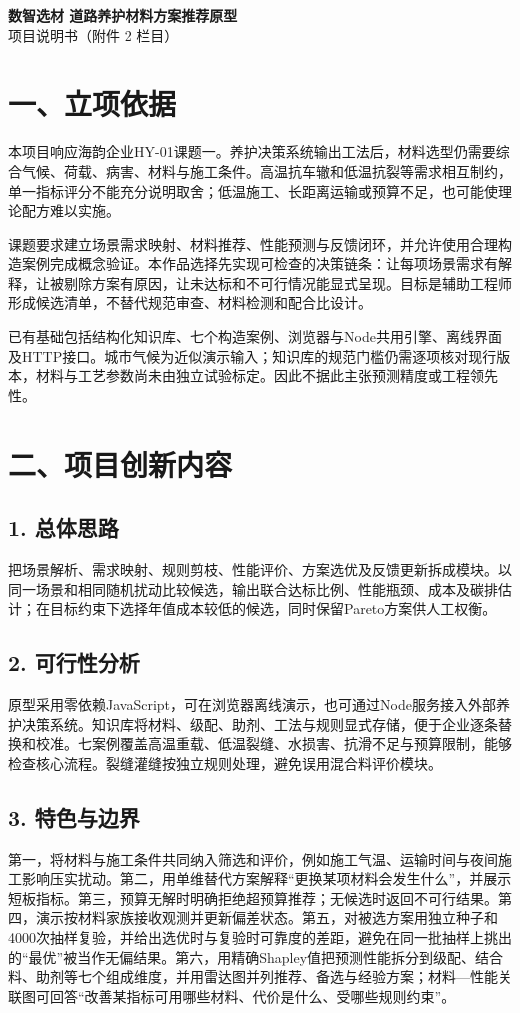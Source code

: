 \documentclass[UTF8,fontset=none,zihao=-4,a4paper]{ctexart}
\begin{document}
\begin{center}{\Large\bfseries\sffamily 数智选材 道路养护材料方案推荐原型}\\[4pt]{\large 项目说明书（附件 2 栏目）}\end{center}
\vspace{2pt}
\section*{一、立项依据}
本项目响应海韵企业HY-01课题一。养护决策系统输出工法后，材料选型仍需要综合气候、荷载、病害、材料与施工条件。高温抗车辙和低温抗裂等需求相互制约，单一指标评分不能充分说明取舍；低温施工、长距离运输或预算不足，也可能使理论配方难以实施。

课题要求建立场景需求映射、材料推荐、性能预测与反馈闭环，并允许使用合理构造案例完成概念验证。本作品选择先实现可检查的决策链条：让每项场景需求有解释，让被剔除方案有原因，让未达标和不可行情况能显式呈现。目标是辅助工程师形成候选清单，不替代规范审查、材料检测和配合比设计。

已有基础包括结构化知识库、七个构造案例、浏览器与Node共用引擎、离线界面及HTTP接口。城市气候为近似演示输入；知识库的规范门槛仍需逐项核对现行版本，材料与工艺参数尚未由独立试验标定。因此不据此主张预测精度或工程领先性。

\section*{二、项目创新内容}
\subsection*{1. 总体思路}
把场景解析、需求映射、规则剪枝、性能评价、方案选优及反馈更新拆成模块。以同一场景和相同随机扰动比较候选，输出联合达标比例、性能瓶颈、成本及碳排估计；在目标约束下选择年值成本较低的候选，同时保留Pareto方案供人工权衡。

\subsection*{2. 可行性分析}
原型采用零依赖JavaScript，可在浏览器离线演示，也可通过Node服务接入外部养护决策系统。知识库将材料、级配、助剂、工法与规则显式存储，便于企业逐条替换和校准。七案例覆盖高温重载、低温裂缝、水损害、抗滑不足与预算限制，能够检查核心流程。裂缝灌缝按独立规则处理，避免误用混合料评价模块。

\subsection*{3. 特色与边界}
第一，将材料与施工条件共同纳入筛选和评价，例如施工气温、运输时间与夜间施工影响压实扰动。第二，用单维替代方案解释“更换某项材料会发生什么”，并展示短板指标。第三，预算无解时明确拒绝超预算推荐；无候选时返回不可行结果。第四，演示按材料家族接收观测并更新偏差状态。第五，对被选方案用独立种子和4000次抽样复验，并给出选优时与复验时可靠度的差距，避免在同一批抽样上挑出的“最优”被当作无偏结果。第六，用精确Shapley值把预测性能拆分到级配、结合料、助剂等七个组成维度，并用雷达图并列推荐、备选与经验方案；材料—性能关联图可回答“改善某指标可用哪些材料、代价是什么、受哪些规则约束”。
\end{document}
